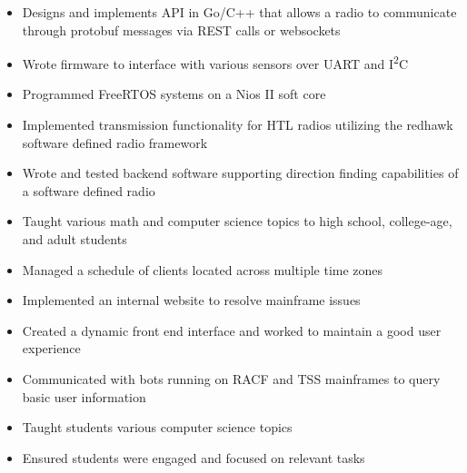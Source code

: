 \documentclass[10pt,a4paper,ragged2e,withhyper]{altacv}
\begin{document}
\begin{paracol}{2}


\begin{itemize}
\item Designs and implements API in Go/C++ that allows a radio to communicate through protobuf messages via REST calls or websockets
\item Wrote firmware to interface with various sensors over UART and I\textsuperscript{2}C
\item Programmed FreeRTOS systems on a Nios II soft core
\item Implemented transmission functionality for HTL radios utilizing the redhawk software defined radio framework
\item Wrote and tested backend software supporting direction finding capabilities of a software defined radio
\end{itemize}

\divider{}

\begin{itemize}
\item Taught various math and computer science topics to high school, college-age, and adult students
\item Managed a schedule of clients located across multiple time zones
\end{itemize}

\divider{}

\begin{itemize}
\item Implemented an internal website to resolve mainframe issues
\item Created a dynamic front end interface and worked to maintain a good user experience
\item Communicated with bots running on RACF and TSS mainframes to query basic user information
\end{itemize}


\begin{itemize}
\item Taught students various computer science topics
\item Ensured students were engaged and focused on relevant tasks
\end{itemize}


\end{paracol}
\end{document}
